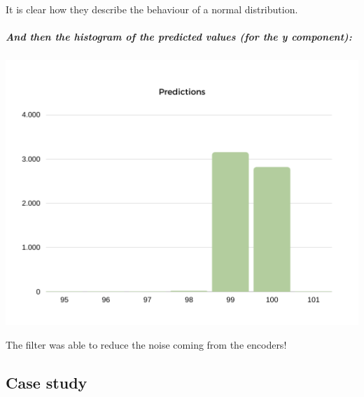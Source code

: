 It is clear how they describe the behaviour of a normal distribution.

\hypertarget{and-then-the-histogram-of-the-predicted-values-for-the-y-component}{%
\subparagraph{And then the histogram of the predicted values (for the y
component):}\label{and-then-the-histogram-of-the-predicted-values-for-the-y-component}}

\includegraphics{pics/Predictions.png}

The filter was able to reduce the noise coming from the encoders!

\hypertarget{case-study}{%
\subsection{Case study}\label{case-study}}

